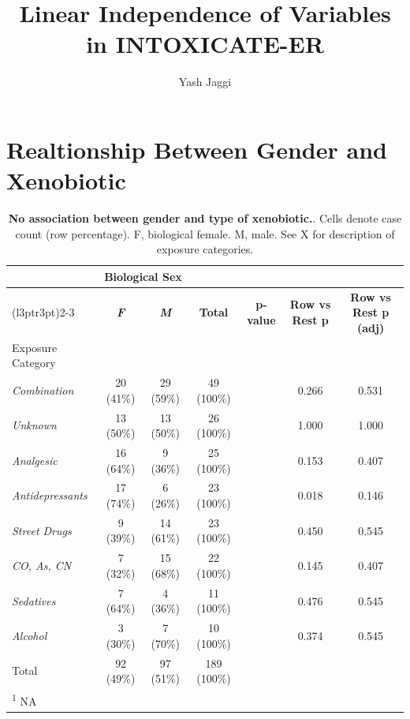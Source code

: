 \documentclass[
]{article}
\title{Linear Independence of Variables in INTOXICATE-ER}
\author{Yash Jaggi}
\date{}
\begin{document}
\maketitle

\section*{Realtionship Between Gender and Xenobiotic}\label{realtionship-between-gender-and-xenobiotic}

\begin{table}[!h]
\centering
\caption{\label{tab:table1}\textbf{No association between gender and type of xenobiotic.}. Cells denote case count (row percentage). F, biological female. M, male. See X for description of exposure categories.}
\centering
\begin{tabular}[t]{lcccccc}
\toprule
\multicolumn{1}{c}{ } & \multicolumn{2}{c}{Biological Sex} & \multicolumn{4}{c}{ } \\
\cmidrule(l{3pt}r{3pt}){2-3}
\textbf{} & \textbf{\textit{F}} & \textbf{\textit{M}} & \textbf{Total} & \textbf{p-value} & \textbf{\textbf{Row vs Rest p}} & \textbf{\textbf{Row vs Rest p (adj)}}\\
\midrule
Exposure Category &  &  &  &  &  & \\
\hspace{1em}\em{Combination} & 20 (41\%) & 29 (59\%) & 49 (100\%) &  & 0.266 & 0.531\\
\hspace{1em}\em{Unknown} & 13 (50\%) & 13 (50\%) & 26 (100\%) &  & 1.000 & 1.000\\
\hspace{1em}\em{Analgesic} & 16 (64\%) & 9 (36\%) & 25 (100\%) &  & 0.153 & 0.407\\
\hspace{1em}\em{Antidepressants} & 17 (74\%) & 6 (26\%) & 23 (100\%) &  & 0.018 & 0.146\\
\addlinespace
\hspace{1em}\em{Street Drugs} & 9 (39\%) & 14 (61\%) & 23 (100\%) &  & 0.450 & 0.545\\
\hspace{1em}\em{CO, As, CN} & 7 (32\%) & 15 (68\%) & 22 (100\%) &  & 0.145 & 0.407\\
\hspace{1em}\em{Sedatives} & 7 (64\%) & 4 (36\%) & 11 (100\%) &  & 0.476 & 0.545\\
\hspace{1em}\em{Alcohol} & 3 (30\%) & 7 (70\%) & 10 (100\%) &  & 0.374 & 0.545\\
Total & 92 (49\%) & 97 (51\%) & 189 (100\%) &  &  & \\
\bottomrule
\multicolumn{7}{l}{\rule{0pt}{1em}\textsuperscript{1} NA}\\
\end{tabular}
\end{table}
\end{document}
